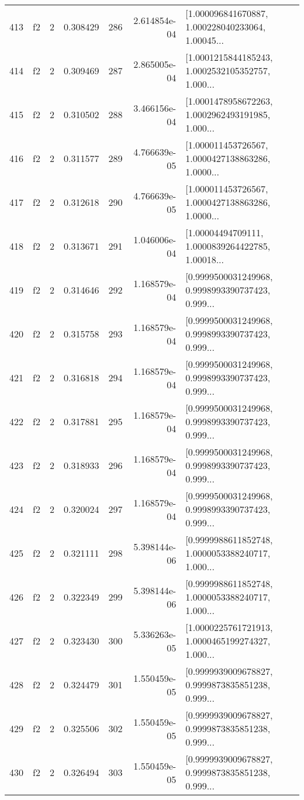 \begin{tabular}{lllrlrl}
413 &  f2 &   2 &  0.308429 &  286 &  2.614854e-04 &  [1.000096841670887, 1.000228040233064, 1.00045... \\
414 &  f2 &   2 &  0.309469 &  287 &  2.865005e-04 &  [1.0001215844185243, 1.0002532105352757, 1.000... \\
415 &  f2 &   2 &  0.310502 &  288 &  3.466156e-04 &  [1.0001478958672263, 1.0002962493191985, 1.000... \\
416 &  f2 &   2 &  0.311577 &  289 &  4.766639e-05 &  [1.000011453726567, 1.0000427138863286, 1.0000... \\
417 &  f2 &   2 &  0.312618 &  290 &  4.766639e-05 &  [1.000011453726567, 1.0000427138863286, 1.0000... \\
418 &  f2 &   2 &  0.313671 &  291 &  1.046006e-04 &  [1.00004494709111, 1.0000839264422785, 1.00018... \\
419 &  f2 &   2 &  0.314646 &  292 &  1.168579e-04 &  [0.9999500031249968, 0.9998993390737423, 0.999... \\
420 &  f2 &   2 &  0.315758 &  293 &  1.168579e-04 &  [0.9999500031249968, 0.9998993390737423, 0.999... \\
421 &  f2 &   2 &  0.316818 &  294 &  1.168579e-04 &  [0.9999500031249968, 0.9998993390737423, 0.999... \\
422 &  f2 &   2 &  0.317881 &  295 &  1.168579e-04 &  [0.9999500031249968, 0.9998993390737423, 0.999... \\
423 &  f2 &   2 &  0.318933 &  296 &  1.168579e-04 &  [0.9999500031249968, 0.9998993390737423, 0.999... \\
424 &  f2 &   2 &  0.320024 &  297 &  1.168579e-04 &  [0.9999500031249968, 0.9998993390737423, 0.999... \\
425 &  f2 &   2 &  0.321111 &  298 &  5.398144e-06 &  [0.9999988611852748, 1.0000053388240717, 1.000... \\
426 &  f2 &   2 &  0.322349 &  299 &  5.398144e-06 &  [0.9999988611852748, 1.0000053388240717, 1.000... \\
427 &  f2 &   2 &  0.323430 &  300 &  5.336263e-05 &  [1.0000225761721913, 1.0000465199274327, 1.000... \\
428 &  f2 &   2 &  0.324479 &  301 &  1.550459e-05 &  [0.9999939009678827, 0.9999873835851238, 0.999... \\
429 &  f2 &   2 &  0.325506 &  302 &  1.550459e-05 &  [0.9999939009678827, 0.9999873835851238, 0.999... \\
430 &  f2 &   2 &  0.326494 &  303 &  1.550459e-05 &  [0.9999939009678827, 0.9999873835851238, 0.999... \\

\end{tabular}

